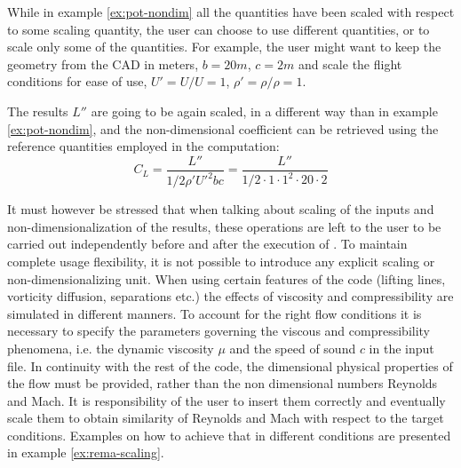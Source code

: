 \begin{example}
\label{ex:pot-part}
While in example \ref{ex:pot-nondim} all the quantities have been scaled 
with respect to some scaling quantity, the user can choose to use different 
quantities, or to scale only some of the quantities. For example, 
the user might want to keep the geometry from the CAD in meters, 
$b = 20 m$, $c = 2 m$ and scale the flight conditions for ease of use, 
$U'=U/U=1$, $\rho' = \rho/\rho = 1$. 

The results $L''$ are going to be again scaled, in a different way than 
in example \ref{ex:pot-nondim}, and the non-dimensional coefficient can 
be retrieved using the reference quantities employed in the computation:
\begin{equation*}
    C_L = \frac{L''}{1/2 \rho' U'^2 b c} = \frac{L''}{1/2 \cdot 1  \cdot 1^2 \cdot 20 \cdot 2}
\end{equation*}
\end{example}

It must however be stressed that when talking about scaling of the inputs 
and non-dimensionalization of the results, these operations are left to the 
user to be carried out independently before and after the execution of \DUST{}. 
To maintain complete usage flexibility, it is not possible to introduce any 
explicit scaling or non-dimensionalizing unit. 
When using certain features of the code (lifting lines, 
vorticity diffusion, separations etc.) the effects of viscosity 
and compressibility are simulated in different manners. 
To account for the right flow conditions it is necessary 
to specify the parameters governing the viscous and 
compressibility phenomena, i.e. the dynamic viscosity 
$\mu$ and the speed of sound $c$ in the input file. 
In continuity with the rest of the code, the dimensional physical 
properties of the flow must be provided, rather than the non dimensional 
numbers Reynolds and Mach. It is responsibility of the user to insert 
them correctly and eventually scale them to obtain similarity of Reynolds 
and Mach with respect to the target conditions. Examples on how to achieve 
that in different conditions are presented in example \ref{ex:rema-scaling}.

